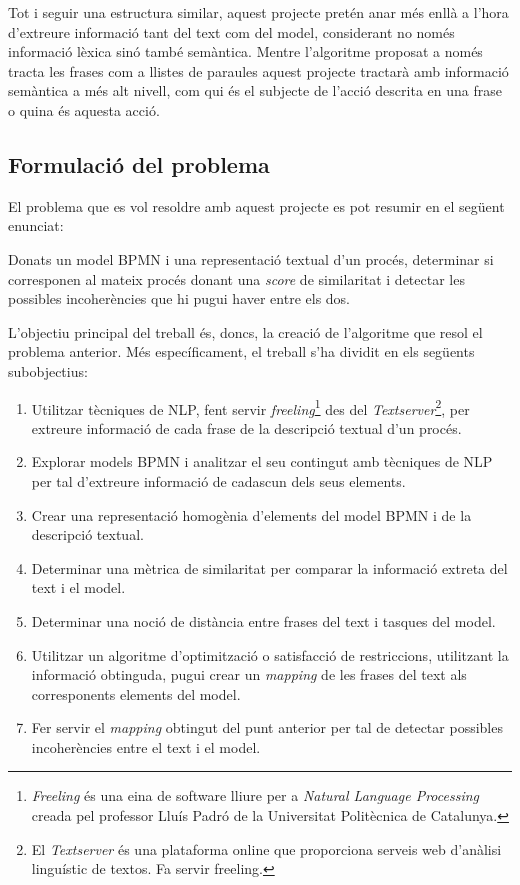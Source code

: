 \documentclass[10pt,a4paper]{article}
\begin{document}
Tot i seguir una estructura similar, aquest projecte pretén anar més enllà a l'hora d'extreure informació tant del text com del model, considerant no només informació lèxica sinó també semàntica. Mentre l'algoritme proposat a \cite{el_paper} només tracta les frases com a llistes de paraules aquest projecte tractarà amb informació semàntica a més alt nivell, com qui és el subjecte de l'acció descrita en una frase o quina és aquesta acció. 

\subsection{Formulació del problema}
\label{formulacio}

El problema que es vol resoldre amb aquest projecte es pot resumir en el següent enunciat: 

\begin{displayquote}
Donats un model BPMN i una representació textual d'un procés, determinar si corresponen al mateix procés donant una \emph{score} de similaritat i detectar les possibles incoherències que hi pugui haver entre els dos.
\end{displayquote}

L'objectiu principal del treball és, doncs, la creació de l'algoritme que resol el problema anterior. Més específicament, el treball s'ha dividit en els següents subobjectius:

\begin{enumerate}
    \item Utilitzar tècniques de NLP, fent servir \emph{freeling}\footnote{\emph{Freeling} \cite{freeling} és una eina de software lliure per a \emph{Natural Language Processing} creada pel professor Lluís Padró de la Universitat Politècnica de Catalunya.} des del \emph{Textserver}\footnote{El \emph{Textserver} \cite{textserver} és una plataforma online que proporciona serveis web d'anàlisi linguístic de textos. Fa servir freeling.}, per extreure informació de cada frase de la descripció textual d'un procés.
    \item Explorar models BPMN i analitzar el seu contingut amb tècniques de NLP per tal d'extreure informació de cadascun dels seus elements.
    \item Crear una representació homogènia d'elements del model BPMN i de la descripció textual.
    \item Determinar una mètrica de similaritat per comparar la informació extreta del text i el model.
    \item Determinar una noció de distància entre frases del text i tasques del model.
    \item Utilitzar un algoritme d'optimització o satisfacció de restriccions, utilitzant la informació obtinguda, pugui crear un \emph{mapping} de les frases del text als corresponents elements del model.
    \item Fer servir el \emph{mapping} obtingut del punt anterior per tal de detectar possibles incoherències entre el text i el model.
\end{enumerate}
\end{document}
